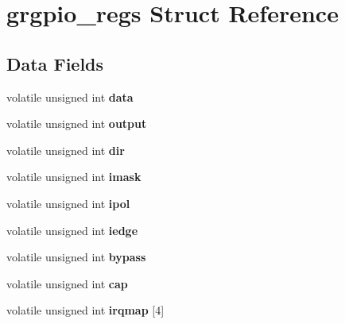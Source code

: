\hypertarget{structgrgpio__regs}{}\section{grgpio\+\_\+regs Struct Reference}
\label{structgrgpio__regs}
\subsection*{Data Fields}
\begin{DoxyCompactItemize}
\item 
\mbox{\label{structgrgpio__regs_ad43293e8cda2b5e91e6016702472295a}} 
volatile unsigned int {\bfseries data}
\item 
\mbox{\label{structgrgpio__regs_aa119cb3826b620999fde2d7b4667a61d}} 
volatile unsigned int {\bfseries output}
\item 
\mbox{\label{structgrgpio__regs_a1ed800a9901c4b6b3ac95ff1a4955d7c}} 
volatile unsigned int {\bfseries dir}
\item 
\mbox{\label{structgrgpio__regs_a2495f014e77c1c84b6be6dcfd752a462}} 
volatile unsigned int {\bfseries imask}
\item 
\mbox{\label{structgrgpio__regs_a2c6d08d843e5adc90fc2137f2c2d962a}} 
volatile unsigned int {\bfseries ipol}
\item 
\mbox{\label{structgrgpio__regs_ac1758f777a5809735b077e9bceeaedf6}} 
volatile unsigned int {\bfseries iedge}
\item 
\mbox{\label{structgrgpio__regs_a55fc9326ed0cd8cb28d1708a9c0ea549}} 
volatile unsigned int {\bfseries bypass}
\item 
\mbox{\label{structgrgpio__regs_a9063978c98eb6652ada3a5b70ad06296}} 
volatile unsigned int {\bfseries cap}
\item 
\mbox{\label{structgrgpio__regs_acc743e379d83bd586cec31c6c23f4e83}} 
volatile unsigned int {\bfseries irqmap} \mbox{[}4\mbox{]}
\item 

\end{DoxyCompactItemize}
